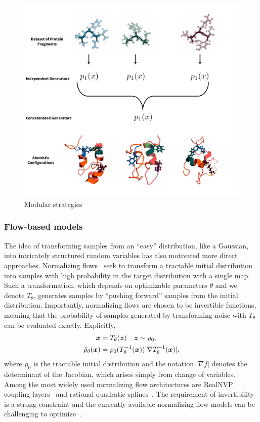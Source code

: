 \documentclass[11pt]{article}
\begin{document}
\begin{figure}
    \centering
    \includegraphics[width=0.6\linewidth]{modular_fig.pdf}
    \caption{Modular strategies}
    \label{fig:modular}
\end{figure}

\subsubsection{Flow-based models}\label{sec:flowmatch}

The idea of transforming samples from an ``easy'' distribution, like a Gaussian, into intricately structured random variables has also motivated more direct approaches.
Normalizing flows~\cite{tabak_density_2010,rezende_variational_2015} seek to transform a tractable initial distribution into samples with high probability in the target distribution with a single map.
Such a transformation, which depends on optimizable parameters $\theta$ and we denote $T_{\theta}$, generates samples by ``pushing forward'' samples from the initial distribution. 
Importantly, normalizing flows are chosen to be invertible functions, meaning that the probability of samples generated by transforming noise with $T_{\theta}$ can be evaluated exactly.
Explicitly,
\begin{equation}
\begin{aligned}
    \boldsymbol{x} &= T_{\theta}(\boldsymbol{z}) \quad \boldsymbol{z} \sim \rho_0, \\
    \hat \rho_\theta(\boldsymbol{x}) &= \rho_0(T_{\theta}^{-1}(\boldsymbol{x})) |\nabla T_{\theta}^{-1}(\boldsymbol{x})|,
\end{aligned}
\end{equation}
where $\rho_0$ is the tractable initial distribution and the notation $|\nabla f|$ denotes the determinant of the Jacobian, which arises simply from change of variables. 
Among the most widely used normalizing flow architectures are RealNVP coupling layers~\cite{dinh_density_2017} and rational quadratic splines~\cite{durkan_neural_2019}.
The requirement of invertibility is a strong constraint and the currently available normalizing flow models can be challenging to optimize~\cite{grathwohl_ffjord_2018,gabrie_adaptive_2022}.
\end{document}

